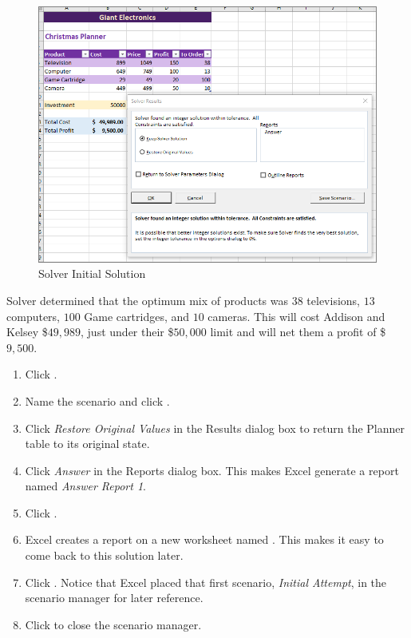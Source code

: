 \begin{figure}[H]
	\centering
	\includegraphics[width=\maxwidth{.95\linewidth}]{gfx/ch08_fig82}
	\caption{Solver Initial Solution}
	\label{08:fig82}
\end{figure}

Solver determined that the optimum mix of products was $ 38 $ televisions, $ 13 $ computers, $ 100 $ Game cartridges, and $ 10 $ cameras. This will cost Addison and Kelsey \$$ 49,989 $, just under their \$$ 50,000 $ limit and will net them a profit of \$$ 9,500 $. 

\begin{enumbox}
	\begin{enumerate}
		\item Click .
		\item Name the scenario  and click .
		\item Click \textit{Restore Original Values} in the Results dialog box to return the Planner table to its original state.
		\item Click \textit{Answer} in the Reports dialog box. This makes Excel generate a report named \textit{Answer Report 1}.
		\item Click .
		\item Excel creates a report on a new worksheet named . This makes it easy to come back to this solution later.
		\item Click .	Notice that Excel placed that first scenario, \textit{Initial Attempt}, in the scenario manager for later reference.
		\item Click  to close the scenario manager.
	\end{enumerate}
\end{enumbox}

